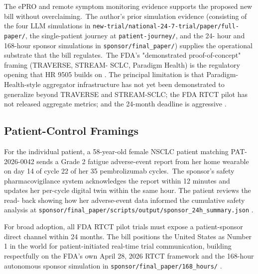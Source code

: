 \hspace{0.5cm} The ePRO and remote symptom monitoring evidence supports the proposed new bill
without overclaiming.\ The author's prior simulation evidence (consisting of the
four LLM simulations in
\texttt{new-trial/national-24-7-trial/paper/full-paper/}, the
single-patient journey at \texttt{patient-journey/}, and the 24-
hour and 168-hour sponsor simulations in \texttt{sponsor/final\_paper/})
supplies the operational substrate that the bill regulates.\ The
FDA's "demonstrated proof-of-concept" framing (TRAVERSE, STREAM-
SCLC, Paradigm Health) is the regulatory opening that HR 9505
builds on \cite{kawchak_2026_19994945, kawchak_2026_19119939,
kawchak_2026_19396256, fda_rtct_press_2026,
fda_dhts_drug_development_2026}. The principal limitation is that
Paradigm-Health-style aggregator infrastructure has not yet been
demonstrated to generalize beyond TRAVERSE and STREAM-SCLC; the
FDA RTCT pilot has not released aggregate metrics; and the 24-month
deadline is aggressive \cite{fda_rtct_press_2026}.

\subsection{Patient-Control Framings}

\hspace{0.5cm} For the individual patient, a 58-year-old female NSCLC patient
matching PAT-2026-0042 sends a Grade 2 fatigue adverse-event report
from her home wearable on day 14 of cycle 22 of her 35
pembrolizumab cycles.\ The sponsor's safety pharmacovigilance system
acknowledges the report within 12 minutes and updates her per-cycle
digital twin within the same hour. The patient reviews the read-
back showing how her adverse-event data informed the cumulative
safety analysis at
\texttt{sponsor/final\_paper/scripts/output/sponsor\_24h\_summary.json}
\cite{kawchak_2026_19119939, kawchak_2026_19396256}.

For broad adoption, all FDA RTCT pilot trials must expose a
patient-sponsor direct channel within 24 months. The bill positions
the United States as Number 1 in the world for patient-initiated
real-time trial communication, building respectfully on the FDA's
own April 28, 2026 RTCT framework and the 168-hour autonomous
sponsor simulation in \texttt{sponsor/final\_paper/168\_hours/}
\cite{kawchak_2026_19396256, kawchak_2026_19994945,
fda_rtct_press_2026}.
